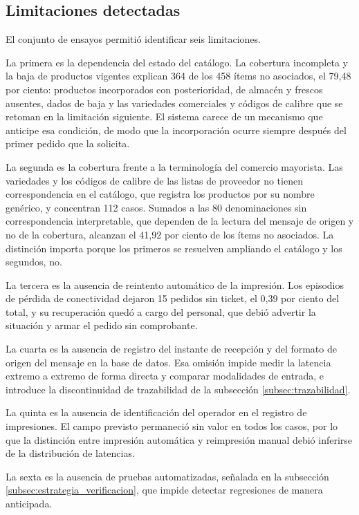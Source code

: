 \FloatBarrier

\subsection{Limitaciones detectadas}
\label{subsec:limitaciones}

El conjunto de ensayos permitió identificar seis limitaciones.

La primera es la dependencia del estado del catálogo. La cobertura incompleta y la baja de productos vigentes explican 364 de los 458 ítems no asociados, el 79,48 por ciento: productos incorporados con posterioridad, de almacén y frescos ausentes, dados de baja y las variedades comerciales y códigos de calibre que se retoman en la limitación siguiente. El sistema carece de un mecanismo que anticipe esa condición, de modo que la incorporación ocurre siempre después del primer pedido que la solicita.

La segunda es la cobertura frente a la terminología del comercio mayorista. Las variedades y los códigos de calibre de las listas de proveedor no tienen correspondencia en el catálogo, que registra los productos por su nombre genérico, y concentran 112 casos. Sumados a las 80 denominaciones sin correspondencia interpretable, que dependen de la lectura del mensaje de origen y no de la cobertura, alcanzan el 41,92 por ciento de los ítems no asociados. La distinción importa porque los primeros se resuelven ampliando el catálogo y los segundos, no.

La tercera es la ausencia de reintento automático de la impresión. Los episodios de pérdida de conectividad dejaron 15 pedidos sin ticket, el 0,39 por ciento del total, y su recuperación quedó a cargo del personal, que debió advertir la situación y armar el pedido sin comprobante.

La cuarta es la ausencia de registro del instante de recepción y del formato de origen del mensaje en la base de datos. Esa omisión impide medir la latencia extremo a extremo de forma directa y comparar modalidades de entrada, e introduce la discontinuidad de trazabilidad de la subsección \ref{subsec:trazabilidad}.

La quinta es la ausencia de identificación del operador en el registro de impresiones. El campo previsto permaneció sin valor en todos los casos, por lo que la distinción entre impresión automática y reimpresión manual debió inferirse de la distribución de latencias.

La sexta es la ausencia de pruebas automatizadas, señalada en la subsección \ref{subsec:estrategia_verificacion}, que impide detectar regresiones de manera anticipada.

